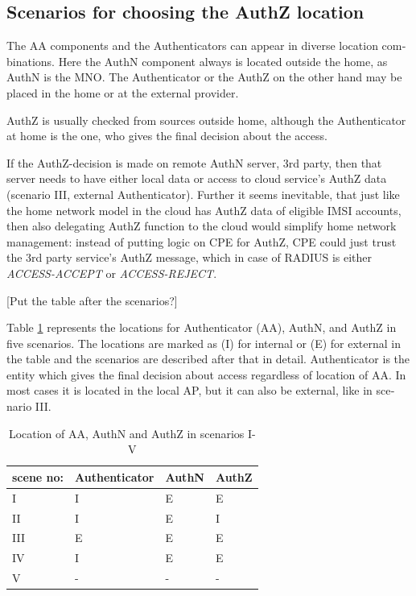 \documentclass[12pt,a4paper,english]{tutthesis}
\begin{document}
\begin{otherlanguage}{english}
\section{Scenarios for choosing the AuthZ location}
\label{sec-4-6}


The AA components and the Authenticators can appear in 
diverse location combinations. Here the AuthN component 
always is located outside the home, as AuthN is the MNO.
The Authenticator or the AuthZ on the other hand
may be placed in the home or at the external provider.

AuthZ is usually checked from sources outside home, 
although the Authenticator at home is the one, who
gives the final decision about the access.

If the AuthZ-decision is made on remote AuthN server, 3rd party, 
then that server needs to have either local data or access to 
cloud service's AuthZ data (scenario III, external Authenticator).
Further it seems inevitable, that just like the home network model
in the cloud has  AuthZ data of eligible IMSI accounts,
then also delegating AuthZ function to the cloud would simplify home network 
management: instead of putting logic on CPE for AuthZ, CPE
could just trust the 3rd party service's AuthZ message, which in case
of RADIUS is either \emph{ACCESS-ACCEPT} or \emph{ACCESS-REJECT}.


[Put the table after the scenarios?]

Table \ref{table-scenarios} represents the locations for Authenticator (AA),
AuthN, and AuthZ in five scenarios. The locations are marked as (I)
for internal or (E) for external in the table and the scenarios are
described after that in detail. Authenticator is the entity which
gives the final decision about access regardless of location of AA.
In most cases it is located in the local AP, but it can also be
external, like in scenario III. 

\begin{table}[htb]
\caption{\label{table-scenarios}Location of AA, AuthN and AuthZ in scenarios I-V}
\centering
\begin{tabular}{llll}
scene no: & Authenticator & AuthN & AuthZ\\
\hline
I & I & E & E\\
II & I & E & I\\
III & E & E & E\\
IV & I & E & E\footnotemark\\
V & - & - & -\\
\end{tabular}
\end{table}



\end{otherlanguage}
\end{document}

